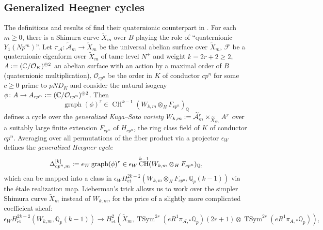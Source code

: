 \documentclass[a4paper]{amsart}
\numberwithin{equation}{section}
\theoremstyle{definition}
\newcommand{\Q}{\mathbb{Q}}
\newcommand{\C}{\mathbb{C}}
\newcommand{\defeq}{\vcentcolon=}
\DeclareMathOperator{\CH}{CH}
\DeclareMathOperator{\et}{\text{\'et}}
\DeclareMathOperator{\TSym}{TSym}
\renewcommand{\et}{\mathrm{\acute{e}t}}
\begin{document}
\subsection{Generalized Heegner cycles} The definitions and results of \cite{BertoliniDarmonPrasanna} find their quaternionic counterpart in \cite{Brooks}. For each $m\ge 0$, there is a Shimura curve $\widetilde{X}_m$ over $B$ playing the role of ``quaternionic $Y_1(Np^m)$''. Let $\pi_{\mathcal{A}}\colon\widetilde{\mathcal{A}}_m\to \widetilde{X}_m$ be the universal abelian surface over $\widetilde{X}_m$, $\mathcal{F}$ be a quaternionic eigenform over $\widetilde{X}_m$ of tame level $N^+$ and weight $k=2r+2\ge 2$, $A\defeq (\C/\mathcal{O}_K)^{\oplus 2}$ an abelian surface with an action by a maximal order of $B$ (quaternionic multiplication), $\mathcal{O}_{cp^n}$ be the order in $K$ of conductor $cp^n$ for some $c\ge 0$ prime to $pND_K$ and consider the natural isogeny $\phi\colon A\to A_{cp^n}\defeq (\C/\mathcal{O}_{cp^n})^{\oplus 2}$. Then \[\operatorname{graph}(\phi)^r\in\CH^{k-1}(W_{k,m}\otimes_{H}F_{cp^n})_{\Q}\] defines a cycle over the \textit{generalized Kuga--Sato variety} $W_{k,m}\defeq \widetilde{\mathcal{A}}_m^r\times_{\widetilde{X}_m}A^r$ over a suitably large finite extension $F_{cp^n}$ of $H_{cp^n}$, the ring class field of $K$ of conductor $cp^n$. Averaging over all permutations of the fiber product via a projector $\epsilon_W$ defines the \textit{generalized Heegner cycle} \[\Delta_{cp^n,m}^{[k]}\defeq \epsilon_W\operatorname{graph}(\phi)^r\in\epsilon_W\CH^{k-1}(W_{k,m}\otimes_{H}F_{cp^n})_{\Q},\] which can be mapped into a class in $\epsilon_{W}H_{\et}^{2k-2}(W_{k,m}\otimes_HF_{cp^n},\Q_p(k-1))$ via the étale realization map. Lieberman's trick allows us to work over the simpler Shimura curve $\widetilde{X}_m$ instead of $W_{k,m}$, for the price of a slightly more complicated coefficient sheaf:
\begin{equation*}
\epsilon_W H_{\et}^{2k-2}(W_{k,m},\Q_p(k-1))\longrightarrow H_{\et}^2\left(\widetilde{X}_m,\TSym^{2r}(eR^1\pi_{\mathcal{A},*}\Q_{p})(2r+1)\otimes \TSym^{2r}(eR^1\pi_{A,*}\Q_{p})\right),
\end{equation*}
\end{document}
